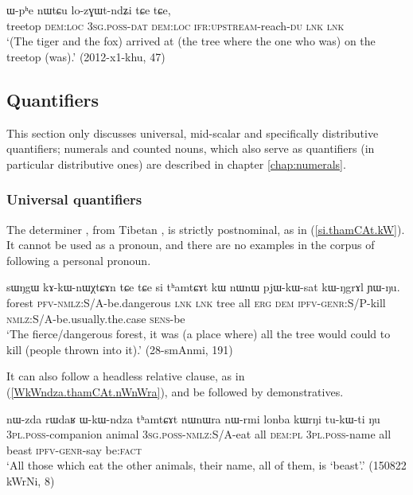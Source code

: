 \begin{exe}
\ex \label{ex:sWkAku.nWtCu}
 ɯ-pʰe nɯtɕu lo-zɣɯt-ndʑi tɕe  tɕe,\\
treetop \textsc{dem}:\textsc{loc} \textsc{3sg}.\textsc{poss}-\textsc{dat} \textsc{dem}:\textsc{loc}  \textsc{ifr}:\textsc{upstream}-reach-\textsc{du} \textsc{lnk} \textsc{lnk} \\
\glt `(The tiger and the fox) arrived at (the tree where the one who was) on the treetop (was).' (2012-x1-khu, 47)
\end{exe}

\subsection{Quantifiers} \label{sec:quantifiers.determiners}
This section only discusses universal, mid-scalar and specifically distributive quantifiers; numerals and counted nouns, which also serve as quantifiers (in particular distributive ones) are described in chapter \ref{chap:numerals}.

\subsubsection{Universal quantifiers} \label{sec:universal.quant}
The determiner , from Tibetan , is strictly postnominal, as in (\ref{si.thamCAt.kW}). It cannot be used as a pronoun, and there are no examples in the corpus of  following a personal pronoun.

\begin{exe}
\ex \label{si.thamCAt.kW}
 \gll   sɯŋgɯ kɤ-kɯ-nɯχtɕɤn tɕe tɕe si tʰamtɕɤt kɯ nɯnɯ pjɯ-kɯ-sat kɯ-ŋgrɤl ɲɯ-ŋu. \\
 forest \textsc{pfv}-\textsc{nmlz}:S/A-be.dangerous \textsc{lnk} \textsc{lnk} tree all \textsc{erg} \textsc{dem} \textsc{ipfv}-\textsc{genr}:S/P-kill  \textsc{nmlz}:S/A-be.usually.the.case \textsc{sens}-be \\
 \glt `The fierce/dangerous forest, it was (a place where) all the tree would could to kill (people thrown into it).' (28-smAnmi, 191)
\end{exe}

It can also follow a headless relative clause, as in (\ref{WkWndza.thamCAt.nWnWra}), and be followed by demonstratives.

\begin{exe}
\ex \label{WkWndza.thamCAt.nWnWra}
 \gll nɯ-zda rɯdaʁ ɯ-kɯ-ndza tʰamtɕɤt nɯnɯra nɯ-rmi lonba kɯrŋi tu-kɯ-ti ŋu \\
 \textsc{3pl}.\textsc{poss}-companion animal \textsc{3sg}.\textsc{poss}-\textsc{nmlz}:S/A-eat all \textsc{dem}:\textsc{pl}  \textsc{3pl}.\textsc{poss}-name all beast \textsc{ipfv}-\textsc{genr}-say be:\textsc{fact} \\
 \glt `All those which eat the other animals, their name, all of them, is `beast'.'  (150822 kWrNi, 8)
 \end{exe}
 
